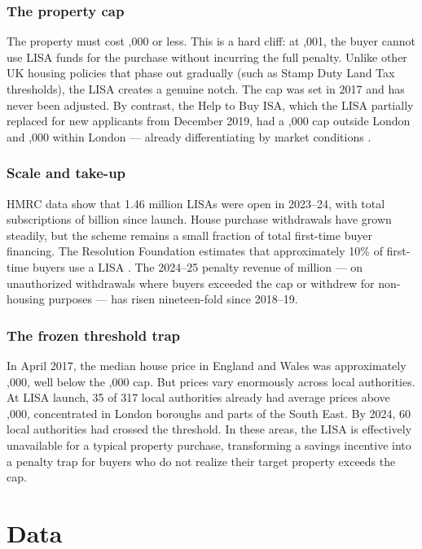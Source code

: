 \documentclass[12pt]{article}
\begin{document}
\subsubsection*{The property cap} The property must cost ,000 or less. This is a hard cliff: at ,001, the buyer cannot use LISA funds for the purchase without incurring the full penalty. Unlike other UK housing policies that phase out gradually (such as Stamp Duty Land Tax thresholds), the LISA creates a genuine notch. The cap was set in 2017 and has never been adjusted. By contrast, the Help to Buy ISA, which the LISA partially replaced for new applicants from December 2019, had a ,000 cap outside London and ,000 within London --- already differentiating by market conditions \citep{wilson_lisa_2023}.

\subsubsection*{Scale and take-up} HMRC data show that 1.46 million LISAs were open in 2023--24, with total subscriptions of  billion since launch. House purchase withdrawals have grown steadily, but the scheme remains a small fraction of total first-time buyer financing. The Resolution Foundation estimates that approximately 10\% of first-time buyers use a LISA \citep{corlett2023}. The 2024--25 penalty revenue of  million --- on unauthorized withdrawals where buyers exceeded the cap or withdrew for non-housing purposes --- has risen nineteen-fold since 2018--19.

\subsubsection*{The frozen threshold trap} In April 2017, the median house price in England and Wales was approximately ,000, well below the ,000 cap. But prices vary enormously across local authorities. At LISA launch, 35 of 317 local authorities already had average prices above ,000, concentrated in London boroughs and parts of the South East. By 2024, 60 local authorities had crossed the threshold. In these areas, the LISA is effectively unavailable for a typical property purchase, transforming a savings incentive into a penalty trap for buyers who do not realize their target property exceeds the cap.

\section{Data}
\end{document}
